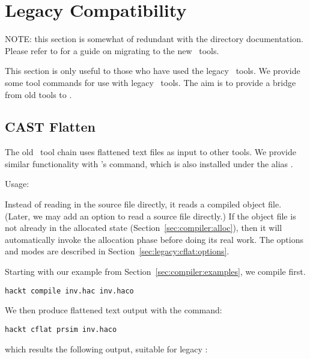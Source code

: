
\chapter{Legacy Compatibility}
\label{sec:legacy}

NOTE: this section is somewhat of redundant with the  
directory documentation.  
Please refer to  for a guide on migrating
to the new \hackt\ tools.  

This section is only useful to those who have used the legacy \CAST\ tools.  
We provide some tool commands for use with legacy \CAST\ tools.  
The aim is to provide a bridge from old tools to \hackt.  

\section{CAST Flatten}
\label{sec:legacy:cflat}

The old \CAST\ tool chain uses flattened text files as input to other tools.  
We provide similar functionality with \binhackt's  command, 
which is also installed under the alias .  

Usage:
\binhackt\   \ttt{[}\ttt{]} 

Instead of reading in the source file directly, it reads a compiled
object file.  
(Later, we may add an option to read a source file directly.)
If the object file is not already in the allocated state
(Section~\ref{sec:compiler:alloc}), then it will automatically
invoke the allocation phase before doing its real work.  
The options and modes are described in 
Section~\ref{sec:legacy:cflat:options}.  

Starting with our example from Section~\ref{sec:compiler:examples}, 
we compile  first.  

\medskip
\begin{verbatim}
hackt compile inv.hac inv.haco
\end{verbatim}

We then produce flattened text output with the command:

\medskip
\begin{verbatim}
hackt cflat prsim inv.haco
\end{verbatim}

\noindent
which results the following output, suitable for legacy :

